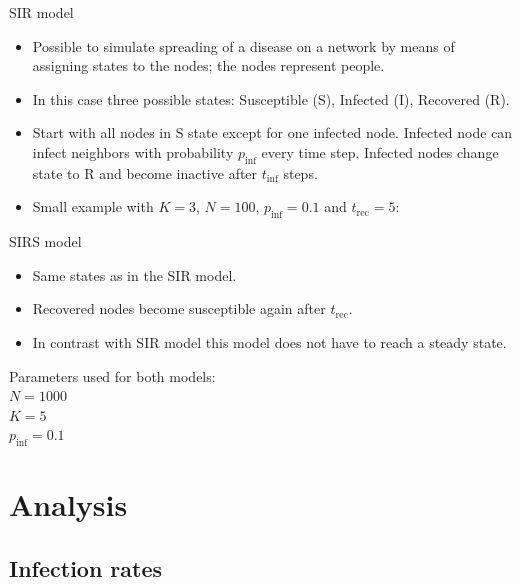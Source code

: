 \documentclass[blackandwhite]{beamer}
\begin{document}
\begin{frame}{SIR model}
	\begin{itemize}
	\item 
	Possible to simulate spreading of a disease on a network by means of assigning states to the nodes; the nodes represent people.
	\item 
	In this case three possible states: Susceptible (S), Infected (I), Recovered (R).
	\item
	Start with all nodes in S state except for one infected node. Infected node can infect neighbors with probability $p_{\text{inf}}$ every time step. Infected nodes change state to R and become inactive after $t_{\text{inf}}$ steps.
	\item
	Small example with $K = 3$, $N = 100$, $p_{\text{inf}} = 0.1$ and $t_{\text{rec}} = 5$: 
	\end{itemize}
\end{frame}

\begin{frame}{SIRS model}
	\begin{itemize}
	\item
	Same states as in the SIR model.
	\item
	Recovered nodes become susceptible again after $t_{\text{rec}}$.
	\item
	In contrast with SIR model this model does not have to reach a steady state.
	\end{itemize}
	Parameters used for both models:\\
	$N = 1000$\\
	$K = 5$\\
	$p_{\text{inf}} = 0.1$	 
\end{frame}


\section{Analysis}

\subsection{Infection rates}
\end{document}
